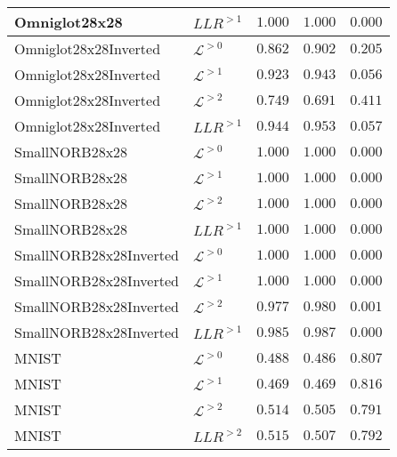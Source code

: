 {\begin{table}[t]
\begin{tabular}{llrrr}
Omniglot28x28                  &  $LLR^{>1}$  &  $1.000$  &  $1.000$  &  $0.000$ \\
\midrule
Omniglot28x28Inverted            &  $\mathcal{L}^{>0}$  &  $0.862$  &  $0.902$  &  $0.205$ \\
Omniglot28x28Inverted            &  $\mathcal{L}^{>1}$  &  $0.923$  &  $0.943$  &  $0.056$ \\
Omniglot28x28Inverted            &  $\mathcal{L}^{>2}$  &  $0.749$  &  $0.691$  &  $0.411$ \\
Omniglot28x28Inverted          &  $LLR^{>1}$  &  $0.944$  &  $0.953$  &  $0.057$ \\
\midrule
SmallNORB28x28                   &  $\mathcal{L}^{>0}$  &  $1.000$  &  $1.000$  &  $0.000$ \\
SmallNORB28x28                   &  $\mathcal{L}^{>1}$  &  $1.000$  &  $1.000$  &  $0.000$ \\
SmallNORB28x28                   &  $\mathcal{L}^{>2}$  &  $1.000$  &  $1.000$  &  $0.000$ \\
SmallNORB28x28                 &  $LLR^{>1}$  &  $1.000$  &  $1.000$  &  $0.000$ \\
\midrule
SmallNORB28x28Inverted           &  $\mathcal{L}^{>0}$  &  $1.000$  &  $1.000$  &  $0.000$ \\
SmallNORB28x28Inverted           &  $\mathcal{L}^{>1}$  &  $1.000$  &  $1.000$  &  $0.000$ \\
SmallNORB28x28Inverted           &  $\mathcal{L}^{>2}$  &  $0.977$  &  $0.980$  &  $0.001$ \\
SmallNORB28x28Inverted         &  $LLR^{>1}$  &  $0.985$  &  $0.987$  &  $0.000$ \\
\midrule
MNIST                            &  $\mathcal{L}^{>0}$  &  $0.488$  &  $0.486$  &  $0.807$ \\
MNIST                            &  $\mathcal{L}^{>1}$  &  $0.469$  &  $0.469$  &  $0.816$ \\
MNIST                            &  $\mathcal{L}^{>2}$  &  $0.514$  &  $0.505$  &  $0.791$ \\
MNIST                          &  $LLR^{>2}$  &  $0.515$  &  $0.507$  &  $0.792$ \\
         \bottomrule
    \end{tabular}
\end{table}
}
